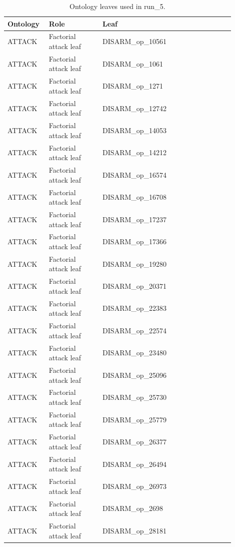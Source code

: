 \begin{table}[htbp]
\centering
\begin{threeparttable}
\caption{Ontology leaves used in run\_5.}
\label{tab:ontologies}
\small
\setlength{\tabcolsep}{4.5pt}
\renewcommand{\arraystretch}{1.10}
\begin{tabular}{p{0.14\linewidth}p{0.22\linewidth}p{0.54\linewidth}}
\toprule
Ontology & Role & Leaf \\
\midrule
ATTACK & Factorial attack leaf & DISARM\_op\_10561 \\
ATTACK & Factorial attack leaf & DISARM\_op\_1061 \\
ATTACK & Factorial attack leaf & DISARM\_op\_1271 \\
ATTACK & Factorial attack leaf & DISARM\_op\_12742 \\
ATTACK & Factorial attack leaf & DISARM\_op\_14053 \\
ATTACK & Factorial attack leaf & DISARM\_op\_14212 \\
ATTACK & Factorial attack leaf & DISARM\_op\_16574 \\
ATTACK & Factorial attack leaf & DISARM\_op\_16708 \\
ATTACK & Factorial attack leaf & DISARM\_op\_17237 \\
ATTACK & Factorial attack leaf & DISARM\_op\_17366 \\
ATTACK & Factorial attack leaf & DISARM\_op\_19280 \\
ATTACK & Factorial attack leaf & DISARM\_op\_20371 \\
ATTACK & Factorial attack leaf & DISARM\_op\_22383 \\
ATTACK & Factorial attack leaf & DISARM\_op\_22574 \\
ATTACK & Factorial attack leaf & DISARM\_op\_23480 \\
ATTACK & Factorial attack leaf & DISARM\_op\_25096 \\
ATTACK & Factorial attack leaf & DISARM\_op\_25730 \\
ATTACK & Factorial attack leaf & DISARM\_op\_25779 \\
ATTACK & Factorial attack leaf & DISARM\_op\_26377 \\
ATTACK & Factorial attack leaf & DISARM\_op\_26494 \\
ATTACK & Factorial attack leaf & DISARM\_op\_26973 \\
ATTACK & Factorial attack leaf & DISARM\_op\_2698 \\
ATTACK & Factorial attack leaf & DISARM\_op\_28181 \\

\end{tabular}
\end{threeparttable}
\end{table}
